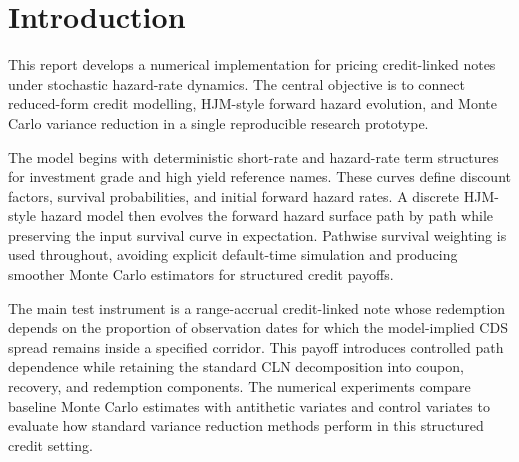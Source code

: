 \section{Introduction}

This report develops a numerical implementation for pricing credit-linked notes under stochastic hazard-rate dynamics. The central objective is to connect reduced-form credit modelling, HJM-style forward hazard evolution, and Monte Carlo variance reduction in a single reproducible research prototype.

The model begins with deterministic short-rate and hazard-rate term structures for investment grade and high yield reference names. These curves define discount factors, survival probabilities, and initial forward hazard rates. A discrete HJM-style hazard model then evolves the forward hazard surface path by path while preserving the input survival curve in expectation. Pathwise survival weighting is used throughout, avoiding explicit default-time simulation and producing smoother Monte Carlo estimators for structured credit payoffs.

The main test instrument is a range-accrual credit-linked note whose redemption depends on the proportion of observation dates for which the model-implied CDS spread remains inside a specified corridor. This payoff introduces controlled path dependence while retaining the standard CLN decomposition into coupon, recovery, and redemption components. The numerical experiments compare baseline Monte Carlo estimates with antithetic variates and control variates to evaluate how standard variance reduction methods perform in this structured credit setting.
